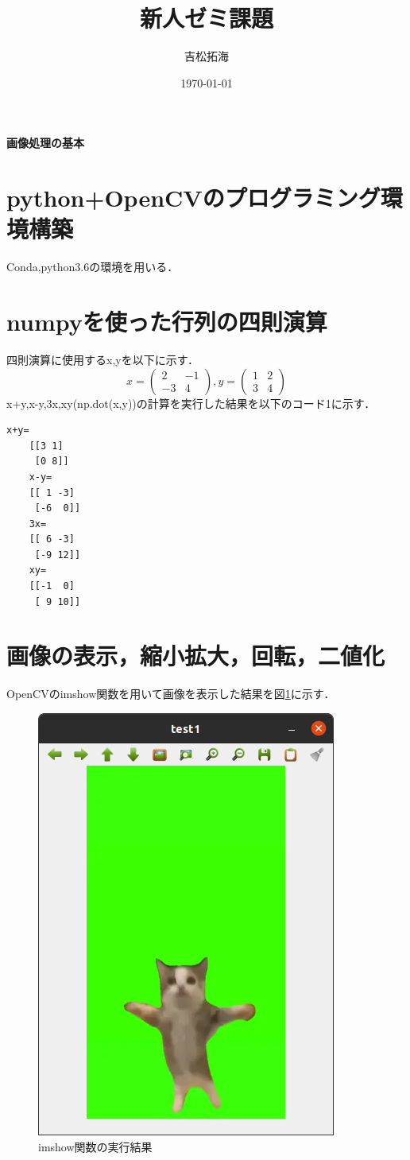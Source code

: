 \documentclass[color,subfigure,epsf,here,cite,otf,comment,nccmath,mediabb,fancyhdr,12pt]{ltjsarticle}
\title{新人ゼミ課題{\vspace{-5mm}}}
\author{吉松拓海}
\date{\today}
\begin{document}
	
	\maketitle
	\vspace*{20pt}

	\begin{center}
		{\LARGE \bf 画像処理の基本}
	\end{center}
    
	\section{python+OpenCVのプログラミング環境構築}
    Conda,python3.6の環境を用いる．
	
	\section{numpyを使った行列の四則演算}
    四則演算に使用するx,yを以下に示す．
    \[
        x=    
        \begin{pmatrix}
            2 & -1 \\
            -3 & 4
        \end{pmatrix}
        , y=     
        \begin{pmatrix}
            1 & 2 \\
            3 & 4
        \end{pmatrix}
    \]
    x+y,x-y,3x,xy(np.dot(x,y))の計算を実行した結果を以下のコード1に示す．
    
    \renewcommand{\lstlistingname}{コード}
    \begin{lstlisting}[caption={行列の四則演算の結果},label=mat]
    x+y=
    [[3 1]
     [0 8]]
    x-y=
    [[ 1 -3]
     [-6  0]]
    3x=
    [[ 6 -3]
     [-9 12]]
    xy=
    [[-1  0]
     [ 9 10]]
    \end{lstlisting}
    \section{画像の表示，縮小拡大，回転，二値化}
    OpenCVのimshow関数を用いて画像を表示した結果を図\ref{fig:imshow}に示す．
    \begin{figure}[H]
        \begin{center}
        \includegraphics[width=0.2\columnwidth]{image/image1.png}
        \caption{imshow関数の実行結果}
        \label{fig:imshow}
        \end{center}
    \end{figure}
\end{document}

